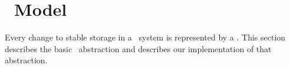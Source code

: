 
\section{\Patch\ Model}
\label{sec:patch}

\makeatletter
\let\emptyset\varnothing
\newcommand{\PBlock}[1]{\ensuremath{\textit{blk}[{#1}]}}
\newcommand{\PB}{\ensuremath{B}}
\newcommand{\PSetlim}[1]{\def\@next{#1}\ifx\@next\@empty\else_{\@next}\fi}
\newcommand{\PMem}[1][]{\ensuremath{\mathpatchset{U}\PSetlim{#1}}}
\newcommand{\PInf}[1][]{\ensuremath{\mathpatchset{F}\PSetlim{#1}}}
\newcommand{\PDisk}[1][]{\ensuremath{\mathpatchset{C}\PSetlim{#1}}}
\newcommand{\PHard}[1][]{\ensuremath{\textit{\Nrb}\PSetlim{#1}}}
\newcommand{\PSoft}[1][]{\ensuremath{\textit{\Rb}\PSetlim{#1}}}
\newcommand{\PEmpty}[1][]{\ensuremath{\textit{\Noop}\PSetlim{#1}}}
\newcommand{\PDDepset}[1]{\ensuremath{\textit{dep}_1[#1]}}
\newcommand{\PDepend}{\ensuremath{\leadsto}}
\newcommand{\PDDepend}{\ensuremath{\rightarrow}}
\newcommand{\PDepset}[1]{\ensuremath{\textit{dep}[#1]}}
\newcommand{\PRDepset}[1]{\ensuremath{\textit{RDep}[#1]}}
\makeatother

Every change to stable storage in a \Kudos\ system is represented by a
\emph{\patch}.
%
This section describes the basic \patch\ abstraction
 and describes our implementation of that abstraction.

\begin{comment}
%
%
Each \patch\ $p$ encapsulates four important pieces of information: its
 \emph{block}, its \emph{state}, a set of \emph{direct dependencies}, and
 some \emph{undo data}.
\end{comment}

